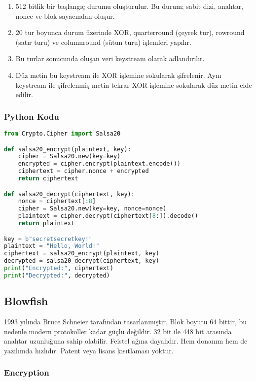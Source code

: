 \begin{enumerate}
    \item 512 bitlik bir başlangıç durumu oluşturulur. Bu durum; sabit dizi, anahtar, nonce ve blok sayacından oluşur.
    \item 20 tur boyunca durum üzerinde XOR, quarterround (çeyrek tur), rowround (satır turu) ve columnround (sütun turu) işlemleri yapılır.
    \item Bu turlar sonucunda oluşan veri keystream olarak adlandırılır.
    \item Düz metin bu keystream ile XOR işlemine sokularak şifrelenir. Aynı keystream ile şifrelenmiş metin tekrar XOR işlemine sokularak düz metin elde edilir.
\end{enumerate}

\subsubsection{Python Kodu}

\begin{lstlisting}[language=Python]
from Crypto.Cipher import Salsa20

def salsa20_encrypt(plaintext, key):
    cipher = Salsa20.new(key=key)
    encrypted = cipher.encrypt(plaintext.encode())
    ciphertext = cipher.nonce + encrypted
    return ciphertext

def salsa20_decrypt(ciphertext, key):
    nonce = ciphertext[:8]
    cipher = Salsa20.new(key=key, nonce=nonce)
    plaintext = cipher.decrypt(ciphertext[8:]).decode()
    return plaintext

key = b"secretsecretkey!"
plaintext = "Hello, World!"
ciphertext = salsa20_encrypt(plaintext, key)
decrypted = salsa20_decrypt(ciphertext, key)
print("Encrypted:", ciphertext)
print("Decrypted:", decrypted)
\end{lstlisting}

\newpage

\subsection{Blowfish}

1993 yılında Bruce Schneier tarafından tasarlanmıştır. Blok boyutu 64 bittir, bu nedenle modern protokoller kadar güçlü değildir. 32 bit ile 448 bit arasında anahtar uzunluğuna sahip olabilir. Feistel ağına dayalıdır. Hem donanım hem de yazılımda hızlıdır. Patent veya lisans kısıtlaması yoktur.

\subsubsection{Encryption}


